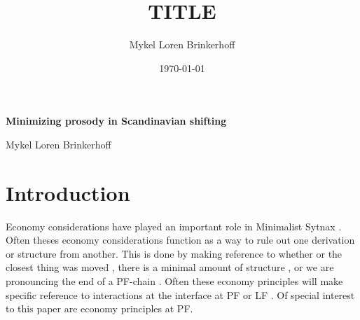 \documentclass[12pt, letterpaper]{article}
\title{TITLE}
\author{Mykel Loren Brinkerhoff}
\date{\today}
\begin{document}

\onehalfspacing

\begin{center}
    {\LARGE \textbf{Minimizing prosody in Scandinavian shifting}}
    \vspace{6pt}

    Mykel Loren Brinkerhoff
\end{center}
\thispagestyle{fancy}


\section{Introduction} \label{sec:Introduction}
Economy considerations have played an important role in Minimalist Sytnax \citep{chomskyMinimalistProgram1995}. Often theses economy considerations function as a way to rule out one derivation or structure from another. This is done by making reference to whether or the closest thing was moved \citep{chomskyMinimalistProgramLinguistic1993}, there is a minimal amount of structure \citep{cardinalettiTypologyStructuralDeficiency1999}, or we are pronouncing the end of a PF-chain \citep{landauChainResolutionHebrew2006,vanurkPronounCopyingDinka2018}. Often these economy principles will make specific reference to interactions at the interface at PF or LF \citep{boskovicDerivationalEconomySyntax2017}. Of special interest to this paper are economy principles at PF.
\end{document}
